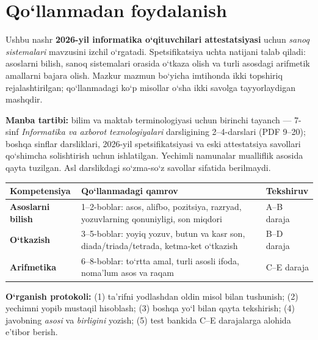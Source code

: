 \documentclass[11pt,a4paper,openany,oneside]{book}
\begin{document}
\frontmatter
\chapter*{Qo‘llanmadan foydalanish}
Ushbu nashr \textbf{2026-yil informatika o‘qituvchilari attestatsiyasi} uchun \emph{sanoq sistemalari} mavzusini izchil o‘rgatadi. Spetsifikatsiya uchta natijani talab qiladi: asoslarni bilish, sanoq sistemalari orasida o‘tkaza olish va turli asosdagi arifmetik amallarni bajara olish. Mazkur mazmun bo‘yicha imtihonda ikki topshiriq rejalashtirilgan; qo‘llanmadagi ko‘p misollar o‘sha ikki savolga tayyorlaydigan mashqdir. 

\begin{important}
\textbf{Manba tartibi:} bilim va maktab terminologiyasi uchun birinchi tayanch — 7-sinf \emph{Informatika va axborot texnologiyalari} darsligining 2–4-darslari (PDF 9–20); boshqa sinflar darsliklari, 2026-yil spetsifikatsiyasi va eski attestatsiya savollari qo‘shimcha solishtirish uchun ishlatilgan. Yechimli namunalar mualliflik asosida qayta tuzilgan. Asl darslikdagi so‘zma-so‘z savollar sifatida berilmaydi.
\end{important}
\begin{center}
\renewcommand{\arraystretch}{1.28}
\begin{tabularx}{\textwidth}{@{}>{\bfseries}p{31mm}X>{\raggedright\arraybackslash}p{25mm}@{}}\toprule
Kompetensiya & Qo‘llanmadagi qamrov & Tekshiruv \\ \midrule
Asoslarni bilish & 1–2-boblar: asos, alifbo, pozitsiya, razryad, yozuvlarning qonuniyligi, son miqdori & A–B daraja \\
O‘tkazish & 3–5-boblar: yoyiq yozuv, butun va kasr son, diada/triada/tetrada, ketma-ket o‘tkazish & B–D daraja \\
Arifmetika & 6–8-boblar: to‘rtta amal, turli asosli ifoda, noma’lum asos va raqam & C–E daraja \\
\bottomrule\end{tabularx}
\end{center}
\textbf{O‘rganish protokoli:} (1) ta’rifni yodlashdan oldin misol bilan tushunish; (2) yechimni yopib mustaqil hisoblash; (3) boshqa yo‘l bilan qayta tekshirish; (4) javobning \emph{asosi} va \emph{birligini} yozish; (5) test bankida C–E darajalarga alohida e’tibor berish.
\end{document}
